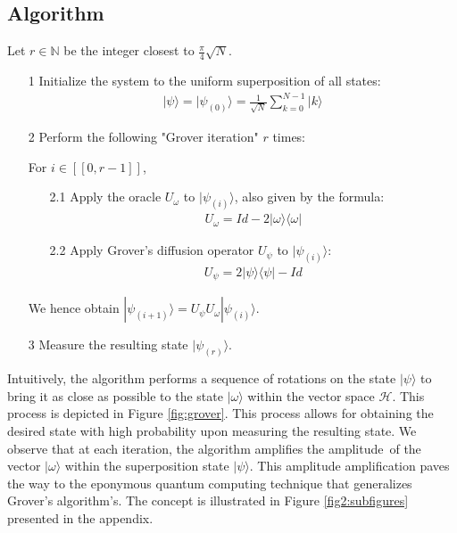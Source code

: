 \subsection{Algorithm}
\begin{algorithm}[H]
Let $r\in \mathbb{N}$ be the integer closest to $\frac{\pi}{4} \sqrt{N}$.
\begin{itemize}
	\item[1] Initialize the system to the uniform superposition of all states:
	\begin{align}
	|\psi \rangle = |\psi_{(0)}\rangle = \frac{1}{\sqrt{N}} \sum_{k=0}^{N-1} |k\rangle
    \label{init}
	\end{align}
	\item[2] Perform the following "Grover iteration" $r$ times:
	\item[] For $i \in [\![0, r-1]\!]$,
	\begin{itemize}
   	 
    	\item[2.1] Apply the oracle $U_{\omega}$ to $|\psi_{(i)}\rangle$, also given by the formula:
    	\begin{align}
    	U_{\omega} = Id -  2|\omega \rangle \langle \omega |
    	\label{Uomega}
    	\end{align}
    	\item[2.2] Apply Grover's diffusion operator $U_{\psi}$ to $|\psi_{(i)}\rangle$:
    	\begin{align}
    	U_{\psi} = 2|\psi\rangle \langle \psi | - Id
        \label{Upsi}
    	\end{align}
	\end{itemize}
	\item[] We hence obtain $|\psi_{(i+1)}\rangle = U_{\psi}U_{\omega} |\psi_{(i)} \rangle$. 
	\item[3] Measure the resulting state $|\psi_{(r)} \rangle$.
\end{itemize}
\end{algorithm}

\noindent  Intuitively, the algorithm performs a sequence of rotations on the state $|\psi \rangle$ to bring it as close as possible to the state $|\omega \rangle$ within the vector space $\mathcal{H}$. This process is depicted in Figure \ref{fig:grover}. 
This process allows for obtaining the desired state with high probability upon measuring the resulting state. 
We observe that at each iteration, the algorithm amplifies the amplitude\footnotemark \, of the vector $|\omega\rangle$ within the superposition state $|\psi\rangle$. This amplitude amplification paves the way to the eponymous quantum computing technique that generalizes Grover's algorithm's. The concept is illustrated in Figure \ref{fig2:subfigures} presented in the appendix.

